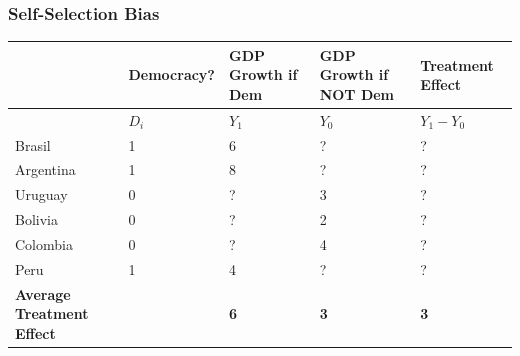 \documentclass[xcolor=x11names,compress]{beamer}\usepackage[]{graphicx}\usepackage[]{xcolor}
\renewcommand{\(}{\begin{columns}}
\renewcommand{\)}{\end{columns}}
\newcommand{\<}[1]{\begin{column}{#1}}
\renewcommand{\>}{\end{column}}
\begin{document}
\begin{frame}
\frametitle{Self-Selection Bias}
\footnotesize
\footnotesize
\begin{table}[htbp]
  \centering
    \begin{tabular}{|p{1.8cm}|p{1.8cm}|p{1.8cm}|p{1.8cm}|p{1.8cm}|}
    \hline
          & \multicolumn{1}{p{1.8cm}|}{Democracy?} & \multicolumn{1}{p{1.8cm}|}{GDP Growth if Dem} & \multicolumn{1}{p{1.8cm}|}{GDP Growth if NOT Dem} & \textbf{Treatment Effect} \bigstrut\\
    \hline
          \multicolumn{1}{|p{1.8cm}|}{} & \multicolumn{1}{p{1.8cm}|}{$D_i$} & \multicolumn{1}{p{2cm}|}{$Y_1$} & \multicolumn{1}{p{2.2cm}|}{$Y_0$} & \multicolumn{1}{p{1.8cm}|}{$Y_{1} - Y_{0}$} \bigstrut\\
    \hline
    Brasil & 1 & 6     & ?     & ? \bigstrut\\
    \hline
    Argentina & 1 & 8    & ?     & ? \bigstrut\\
    \hline
    Uruguay & 0 & ? & 3 & ?  \bigstrut\\
    \hline
    Bolivia & 0 & ?     & 2     & ? \bigstrut\\
    \hline
    Colombia & 0 & ?    & 4    & ? \bigstrut\\
    \hline
    Peru & 1 & 4     & ?     & ? \bigstrut\\
    \hline
    \textbf{Average Treatment Effect} & & \textbf{6} & \textbf{3} & \textbf{3} \bigstrut\\
    \hline
    \end{tabular}%
  \label{tab:addlabel}%
\end{table}%
\normalsize
\end{frame}
\end{document}
